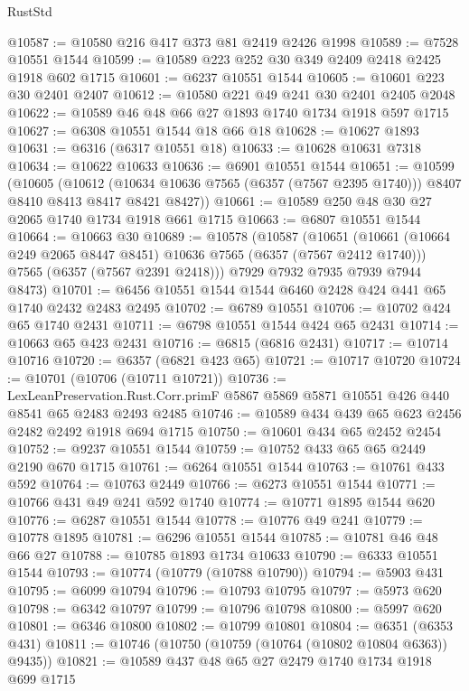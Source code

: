 \begin{lexlean}{RustStd}
\begin{coremodule}
@10587 := @10580 @216 @417 @373 @81 @2419 @2426 @1998
@10589 := @7528 @10551 @1544
@10599 := @10589 @223 @252 @30 @349 @2409 @2418 @2425 @1918 @602 @1715
@10601 := @6237 @10551 @1544
@10605 := @10601 @223 @30 @2401 @2407
@10612 := @10580 @221 @49 @241 @30 @2401 @2405 @2048
@10622 := @10589 @46 @48 @66 @27 @1893 @1740 @1734 @1918 @597 @1715
@10627 := @6308 @10551 @1544 @18 @66 @18
@10628 := @10627 @1893
@10631 := @6316 (@6317 @10551 @18)
@10633 := @10628 @10631 @7318
@10634 := @10622 @10633
@10636 := @6901 @10551 @1544
@10651 := @10599
    (@10605
      (@10612
        (@10634 @10636 @7565 (@6357 (@7567 @2395 @1740)))
        @8407
        @8410
        @8413
        @8417
        @8421
        @8427))
@10661 := @10589 @250 @48 @30 @27 @2065 @1740 @1734 @1918 @661 @1715
@10663 := @6807 @10551 @1544
@10664 := @10663 @30
@10689 := @10578
    (@10587
      (@10651
        (@10661 (@10664 @249 @2065 @8447 @8451) @10636 @7565 (@6357 (@7567 @2412 @1740)))
        @7565
        (@6357 (@7567 @2391 @2418)))
      @7929
      @7932
      @7935
      @7939
      @7944
      @8473)
@10701 := @6456 @10551 @1544 @1544 @6460 @2428 @424 @441 @65 @1740 @2432 @2483 @2495
@10702 := @6789 @10551
@10706 := @10702 @424 @65 @1740 @2431
@10711 := @6798 @10551 @1544 @424 @65 @2431
@10714 := @10663 @65 @423 @2431
@10716 := @6815 (@6816 @2431)
@10717 := @10714 @10716
@10720 := @6357 (@6821 @423 @65)
@10721 := @10717 @10720
@10724 := @10701 (@10706 (@10711 @10721))
@10736 := LexLeanPreservation.Rust.Corr.primF
    @5867
    @5869
    @5871
    @10551
    @426
    @440
    @8541
    @65
    @2483
    @2493
    @2485
@10746 := @10589 @434 @439 @65 @623 @2456 @2482 @2492 @1918 @694 @1715
@10750 := @10601 @434 @65 @2452 @2454
@10752 := @9237 @10551 @1544
@10759 := @10752 @433 @65 @65 @2449 @2190 @670 @1715
@10761 := @6264 @10551 @1544
@10763 := @10761 @433 @592
@10764 := @10763 @2449
@10766 := @6273 @10551 @1544
@10771 := @10766 @431 @49 @241 @592 @1740
@10774 := @10771 @1895 @1544 @620
@10776 := @6287 @10551 @1544
@10778 := @10776 @49 @241
@10779 := @10778 @1895
@10781 := @6296 @10551 @1544
@10785 := @10781 @46 @48 @66 @27
@10788 := @10785 @1893 @1734 @10633
@10790 := @6333 @10551 @1544
@10793 := @10774 (@10779 (@10788 @10790))
@10794 := @5903 @431
@10795 := @6099 @10794
@10796 := @10793 @10795
@10797 := @5973 @620
@10798 := @6342 @10797
@10799 := @10796 @10798
@10800 := @5997 @620
@10801 := @6346 @10800
@10802 := @10799 @10801
@10804 := @6351 (@6353 @431)
@10811 := @10746 (@10750 (@10759 (@10764 (@10802 @10804 @6363)) @9435))
@10821 := @10589 @437 @48 @65 @27 @2479 @1740 @1734 @1918 @699 @1715

\end{coremodule}
\end{lexlean}
